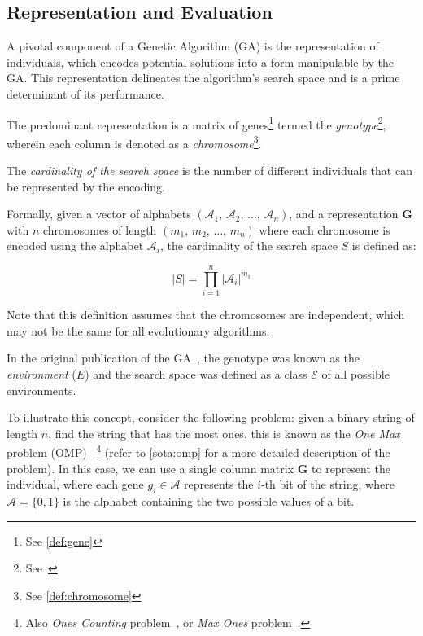 \subsection{Representation and Evaluation}
\label{sec:bg:ga:repr}
  A pivotal component of a Genetic Algorithm (GA) is the representation of 
  individuals, which encodes potential solutions into a form manipulable by the 
  GA.
  This representation delineates the algorithm's search space and is a prime 
  determinant of its performance.

  The predominant representation is a matrix of genes\footnote{See 
  \vref{def:gene}} termed the \emph{genotype}\footnote{
    See~\autocite{wilhelmstotterJeneticsJavaGenetica}
  }, wherein each column is denoted as a \emph{chromosome}\footnote{
    See \vref{def:chromosome}
  }.

  \begin{definition}
  \label{def:cardinality_of_the_search_space}
    The \emph{cardinality of the search space} is the number of different individuals that can be represented by the encoding.

    Formally, given a vector of alphabets \((\mathcal{A}_1,\, \mathcal{A}_2,\, \dots,\, \mathcal{A}_n)\), 
    and a representation \(\mathbf{G}\) with \(n\) chromosomes of length 
    \((m_1,\, m_2,\, \dots,\, m_n)\) where each chromosome is encoded using the
    alphabet \(\mathcal{A}_i\), the cardinality of the search space \(S\) is 
    defined as:
    
    \begin{equation}
      \label{eq:cardinality_of_the_search_space}
      |S| = \prod_{i=1}^n |\mathcal{A}_i|^{m_i}
    \end{equation}

    Note that this definition assumes that the chromosomes are independent, which may not be the 
    same for all evolutionary algorithms.
  \end{definition}

  \begin{remark}
    In the original publication of the GA~\autocite{hollandAdaptationNaturalArtificial1992a},
    the genotype was known as the \emph{environment} (\(E\)) and the search 
    space was defined as a class \(\mathcal{E}\) of all possible environments.
  \end{remark}

  To illustrate this concept, consider the following problem: given a binary 
  string of length \(n\), find the string that has the most ones, this is known 
  as the \emph{One Max} problem (OMP)~\autocite{andonovUnboundedKnapsackProblem2000}
  \footnote{
    Also \emph{Ones Counting} problem~\autocite{wilhelmstotterJeneticsJavaGenetica}, or \emph{Max Ones} problem~\autocite{ECJ}.
  } (refer to \vref{sota:omp} for a more detailed description of the problem).
  In this case, we can use a single column matrix \(\mathbf{G}\) to represent the individual, 
  where each gene \(g_i \in \mathcal{A}\) represents the \(i\)-th bit of the string, where 
  \(\mathcal{A} = \{0, 1\}\) is the alphabet containing the two possible values of a bit.
  
